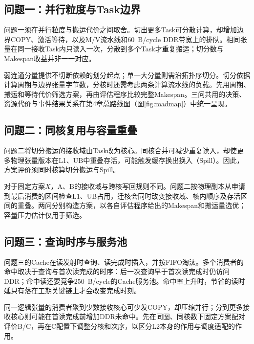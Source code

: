 \subsection{问题一：并行粒度与Task边界}
问题一须在并行粒度与搬运代价之间取舍。切出更多Task可分散计算，却增加边界COPY、激活等待，以及M/V流水线和60~B/cycle DDR带宽上的排队。相同张量在同一接收Task内只读入一次，分散到多个Task才重复搬运；切分数与Makespan收益并非一一对应。

弱连通分量提供不切断依赖的划分起点；单一大分量则需沿拓扑序切分。切分依据计算周期与边界张量字节数，分核时还需考虑两条计算流水线的负载。先用周期、搬运和等待代价筛选方案，再由评估程序比较完整Makespan。三问共用的决策、资源代价与事件结果关系在第4章总路线图（图\ref{fig:roadmap}）中统一呈现。

\subsection{问题二：同核复用与容量重叠}
问题二将切分搬运的接收域由Task改为核心。同核合并可减少重复读入，却使更多物理张量版本在L1、UB中重叠存活，可能触发缓存换出换入（Spill）。因此，方案评价须同时核算切分搬运与Spill。

对于固定方案$X$，A、B的接收域与跨核写回规则不同。问题二按物理副本从申请到最后消费的区间检查L1、UB占用，迁核会同时改变接收域、核内顺序及存活区间的重叠。两问分别构造方案，以各自评估程序给出的Makespan和搬运量选优；容量压力估计仅用于筛选。

\subsection{问题三：查询时序与服务池}
问题三的Cache在读发射时查询、读完成时插入，并按FIFO淘汰。多个消费者的命中取决于查询与首次读完成的时序：后一次查询早于首次读完成时仍访问DDR；命中读还要竞争250~B/cycle的Cache服务池。命中率上升时，节省的读时延只有落在工期关键链上才会改变完成时刻。

同一逻辑张量的消费者聚到少数接收核心可少发COPY，却压缩并行；分到更多接收核心则可能在首读完成前增加DDR未命中。先在同图、同核数下固定方案配对评价B/C，再在C配置下调整分核和次序，以区分L2本身的作用与调度适配的作用。
